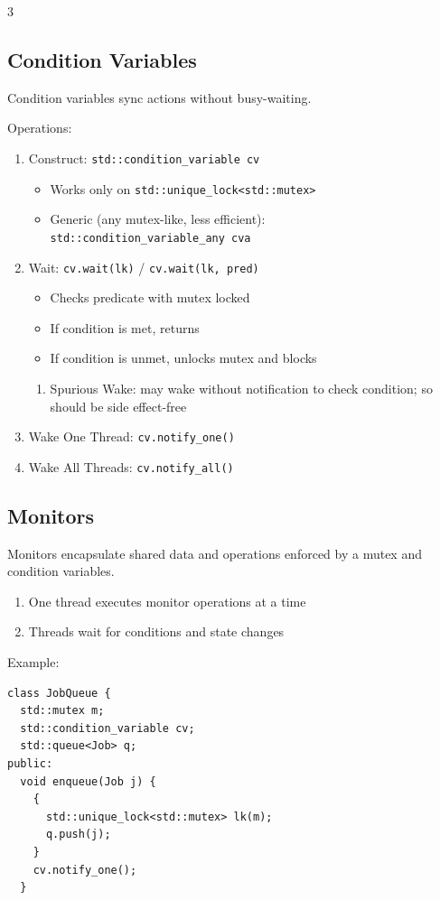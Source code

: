\documentclass[12pt, a4paper]{article}
\begin{document}
\begin{multicols*}{3}
\subsection{Condition Variables}

Condition variables sync actions without busy-waiting.

Operations:
\begin{enumerate}[\roman*.]
  \item {Construct: \lstinline|std::condition_variable cv|} 
    \begin{itemize}[leftmargin=*]\vspace{3pt}
      \item Works only on \lstinline|std::unique_lock<std::mutex>|
      \item Generic (any mutex-like, less efficient):\\\lstinline|std::condition_variable_any cva|
    \end{itemize}
  \item Wait: \lstinline|cv.wait(lk)| / \lstinline|cv.wait(lk, pred)| 
    \begin{itemize}[leftmargin=*]\vspace{3pt}
      \item Checks predicate with mutex locked
      \item If condition is met, returns
      \item If condition is unmet, unlocks mutex and blocks
    \end{itemize}
    \begin{enumerate}[leftmargin=*, label=$-$]\vspace{5pt}
      \item Spurious Wake: may wake without notification to check condition; so should be side effect-free
    \end{enumerate}
  \item Wake One Thread: \lstinline|cv.notify_one()|
  \item Wake All Threads: \lstinline|cv.notify_all()|
\end{enumerate}

\subsection{Monitors}
Monitors encapsulate shared data and operations enforced by a mutex and condition variables.
\begin{enumerate}[\roman*.]
  \item One thread executes monitor operations at a time 
  \item Threads wait for conditions and state changes
\end{enumerate}
Example:
\begin{lstlisting}[basicstyle=\ttfamily\scriptsize]
class JobQueue {
  std::mutex m;
  std::condition_variable cv;
  std::queue<Job> q;
public:
  void enqueue(Job j) {
    {
      std::unique_lock<std::mutex> lk(m);
      q.push(j);
    }
    cv.notify_one();
  }


\end{lstlisting}
\end{multicols*}
\end{document}
